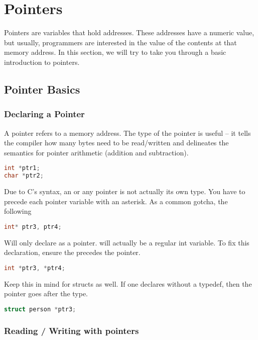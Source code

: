 \section{Pointers}

Pointers are variables that hold addresses.
These addresses have a numeric value, but usually, programmers are interested in the value of the contents at that memory address.
In this section, we will try to take you through a basic introduction to pointers.

\subsection{Pointer Basics}

\subsubsection{Declaring a Pointer}

A pointer refers to a memory address. The type of the pointer is useful -- it tells the compiler how many bytes need to be read/written and delineates the semantics for pointer arithmetic (addition and subtraction).

\begin{lstlisting}[language=C]
int *ptr1;
char *ptr2;
\end{lstlisting}

Due to C's syntax, an  or any pointer is not actually its own type.
You have to precede each pointer variable with an asterisk.
As a common gotcha, the following

\begin{lstlisting}[language=C]
int* ptr3, ptr4;
\end{lstlisting}

Will only declare  as a pointer.
 will actually be a regular int variable.
To fix this declaration, ensure the \keyword{*} precedes the pointer.

\begin{lstlisting}[language=C]
int *ptr3, *ptr4;
\end{lstlisting}

Keep this in mind for structs as well.
If one declares without a typedef, then the pointer goes after the type.

\begin{lstlisting}[language=C]
struct person *ptr3;
\end{lstlisting}

\subsubsection{Reading / Writing with pointers}

